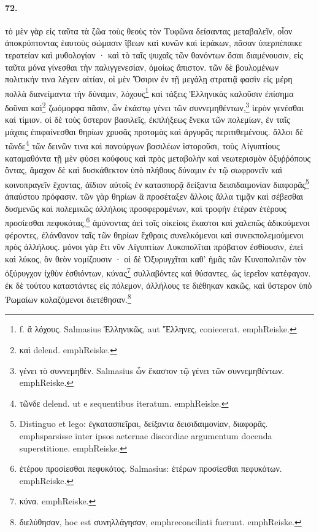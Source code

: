 \documentclass[a4paper, 11pt, oneside, polutonikogreek, german]{article}
\begin{document}
\paragraph{72.}
τὸ μὲν γὰρ εἰς ταῦτα τὰ ζῶα τοὺς θεοὺς τὸν Τυφῶνα δείσαντας μεταβαλεῖν, οἷον ἀποκρύπτοντας ἑαυτοὺς σώμασιν ἴβεων καὶ κυνῶν καὶ ἱεράκων, πᾶσαν ὑπερπέπαικε τερατείαν καὶ μυθολογίαν · καὶ τὸ ταῖς ψυχαῖς τῶν θανόντων ὅσαι διαμένουσιν, εἰς ταῦτα μόνα γίνεσθαι τὴν παλιγγενεσίαν, ὁμοίως ἄπιστον. τῶν δὲ βουλομένων πολιτικήν τινα λέγειν αἰτίαν, οἱ μὲν Ὄσιριν ἐν τῇ μεγάλῃ στρατιᾷ φασὶν εἰς μέρη πολλὰ διανείμαντα τὴν δύναμιν, λόχους\footnote{f. ἃ λόχους. Salmasius Ἑλληνικῶς, aut Ἕλληνες, coniecerat. emph{Reiske.}} καὶ τάξεις Ἑλληνικὰς καλοῦσιν ἐπίσημα δοῦναι καὶ\footnote{καὶ delend. emph{Reiske.}} ζωόμορφα πᾶσιν, ὧν ἑκάστῳ γένει τῶν συννεμηθέντων,\footnote{γένει τὸ συννεμηθὲν. Salmasius ὧν ἕκαστον τῷ γένει τῶν συννεμηθέντων. emph{Reiske.}} ἱερὸν γενέσθαι καὶ τίμιον. οἱ δὲ τοὺς ὕστερον βασιλεῖς, ἐκπλήξεως ἕνεκα τῶν πολεμίων, ἐν ταῖς μάχαις ἐπιφαίνεσθαι θηρίων χρυσᾶς προτομὰς καὶ ἀργυρᾶς περιτιθεμένους. ἄλλοι δὲ τῶνδε\footnote{τῶνδε delend. ut e sequentibus iteratum. emph{Reiske.}} τῶν δεινῶν τινα καὶ πανούργων βασιλέων ἱστοροῦσι, τοὺς Αἰγυπτίους καταμαθόντα τῇ μὲν φύσει κούφους καὶ πρὸς μεταβολὴν καὶ νεωτερισμὸν ὀξυῤῥόπους ὄντας, ἄμαχον δὲ καὶ δυσκάθεκτον ὑπὸ πλήθους δύναμιν ἐν τῷ σωφρονεῖν καὶ κοινοπραγεῖν ἔχοντας, ἀΐδιον αὐτοῖς ἐν κατασπορᾷ δείξαντα δεισιδαιμονίαν διαφορᾶς\footnote{Distinguo et lego: ἐγκατασπεῖραι, δείξαντα δεισιδαιμονίαν, διαφορᾶς. emph{sparsisse inter ipsos aeternae discordiae argumentum docenda superstitione.} emph{Reiske.}} ἀπαύστου πρόφασιν. τῶν γὰρ θηρίων ἃ προσέταξεν ἄλλοις ἄλλα τιμᾷν καὶ σέβεσθαι δυσμενῶς καὶ πολεμικῶς ἀλλήλοις προσφερομένων, καὶ τροφὴν ἑτέραν ἑτέρους προσίεσθαι πεφυκότας,\footnote{ἑτέρου προσίεσθαι πεφυκότος. Salmasius: ἑτέρων προσίεσθαι πεφυκότων. emph{Reiske.}} ἀμύνοντας ἀεὶ τοῖς οἰκείοις ἕκαστοι καὶ χαλεπῶς ἀδικούμενοι φέροντες, ἐλάνθανον ταῖς τῶν θηρίων ἔχθραις συνελκόμενοι καὶ συνεκπολεμούμενοι πρὸς ἀλλήλους. μόνοι γὰρ ἔτι νῦν Αἰγυπτίων Λυκοπολῖται πρόβατον ἐσθίουσιν, ἐπεὶ καὶ λύκος, ὃν θεὸν νομίζουσιν · οἱ δὲ Ὀξυρυγχῖται καθ' ἡμᾶς τῶν Κυνοπολιτῶν τὸν ὀξύρυγχον ἰχθὺν ἐσθιόντων, κύνας\footnote{κύνα. emph{Reiske.}} συλλαβόντες καὶ θύσαντες, ὡς ἱερεῖον κατέφαγον. ἐκ δὲ τούτου καταστάντες εἰς πόλεμον, ἀλλήλους τε διέθηκαν κακῶς, καὶ ὕστερον ὑπὸ Ῥωμαίων κολαζόμενοι διετέθησαν.\footnote{διελύθησαν, hoc est συνηλλάγησαν, emph{reconciliati fuerunt.} emph{Reiske.}}
\end{document}
